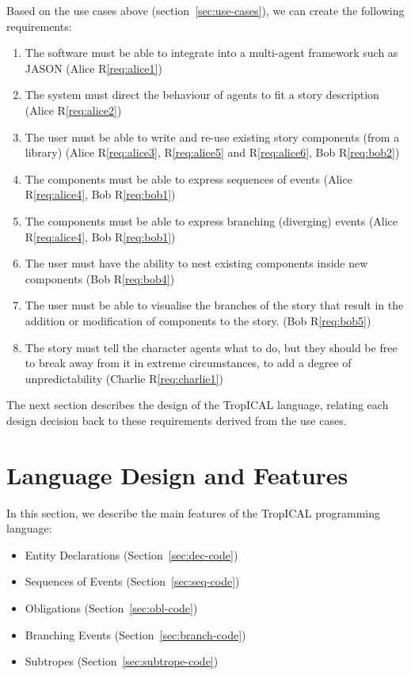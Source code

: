 \documentclass[11pt]{report}
\begin{document}
Based on the use cases above (section~\ref{sec:use-cases}), we can create the
following requirements:

\begin{enumerate}[R1.]
  \item\label{req:agents} The software must be able to integrate into a
    multi-agent framework such as JASON (Alice R\ref{req:alice1})
  \item\label{req:direct} The system must direct the behaviour of agents to fit
    a story description (Alice R\ref{req:alice2})
  \item\label{req:components} The user must be able to write and re-use
    existing story components (from a library) (Alice R\ref{req:alice3}, R\ref{req:alice5} and R\ref{req:alice6}, Bob R\ref{req:bob2})
  \item\label{req:sequences} The components must be able to express sequences of
    events (Alice R\ref{req:alice4}, Bob R\ref{req:bob1})
  \item\label{req:branches} The components must be able to express branching
    (diverging) events (Alice R\ref{req:alice4}, Bob R\ref{req:bob1})
  \item\label{req:subtropes} The user must have the ability to nest existing
    components inside new components (Bob R\ref{req:bob4})
  \item\label{req:vis} The user must be able to visualise the branches of the
    story that result in the addition or modification of components to the
    story. (Bob R\ref{req:bob5})
  \item\label{req:norm} The story must tell the character agents what to do, but
    they should be free to break away from it in extreme circumstances, to add a
    degree of unpredictability (Charlie R\ref{req:charlie1})
\end{enumerate}

The next section describes the design of the TropICAL language, relating each
design decision back to these requirements derived from the use cases.

\section{Language Design and Features}
\label{sec:language-design}
In this section, we describe the main features of the TropICAL programming
language:

\begin{itemize}
  \item Entity Declarations (Section~\ref{sec:dec-code})
  \item Sequences of Events (Section~\ref{sec:seq-code})
  \item Obligations (Section~\ref{sec:obl-code})
  \item Branching Events (Section~\ref{sec:branch-code})
  \item Subtropes (Section~\ref{sec:subtrope-code})
\end{itemize}
\end{document}
